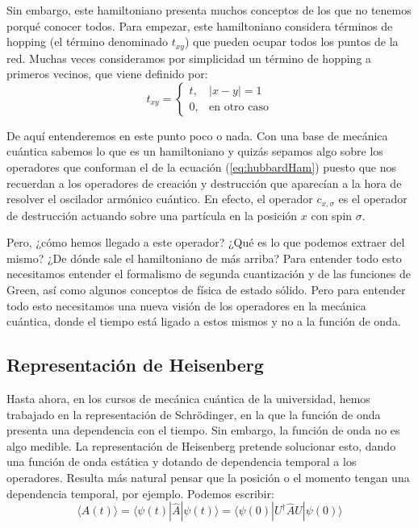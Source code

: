 \documentclass[12pt,twoside]{article}
\begin{document}
Sin embargo, este hamiltoniano presenta muchos conceptos de los que no tenemos porqué conocer todos. Para empezar, este hamiltoniano considera términos de hopping (el término denominado $t_{xy}$) que pueden ocupar todos los puntos de la red. Muchas veces consideramos por simplicidad un término de hopping a primeros vecinos, que viene definido por:
\begin{equation}
  t_{xy} = \left\{\begin{array}{cc}
    t, & |x - y| = 1 \\
    0, & \text{en otro caso}
  \end{array}\right.
  \label{eq:hoppinFN}
\end{equation}

De aquí entenderemos en este punto poco o nada. Con una base de mecánica cuántica sabemos lo que es un hamiltoniano y quizás sepamos algo sobre los operadores que conforman el de la ecuación (\ref{eq:hubbardHam}) puesto que nos recuerdan a los operadores de creación y destrucción que aparecían a la hora de resolver el oscilador armónico cuántico. En efecto, el operador $c_{x,\sigma}$ es el operador de destrucción actuando sobre una partícula en la posición $x$ con spin $\sigma$.

Pero, ¿cómo hemos llegado a este operador? ¿Qué es lo que podemos extraer del mismo? ¿De dónde sale el hamiltoniano de más arriba? Para entender todo esto necesitamos entender el formalismo de segunda cuantización y de las funciones de Green, así como algunos conceptos de física de estado sólido. Pero para entender todo esto necesitamos una nueva visión de los operadores en la mecánica cuántica, donde el tiempo está ligado a estos mismos y no a la función de onda.
\subsection{Representación de Heisenberg}

Hasta ahora, en los cursos de mecánica cuántica de la universidad, hemos trabajado en la representación de Schrödinger, en la que la función de onda presenta una dependencia con el tiempo. Sin embargo, la función de onda no es algo medible. La representación de Heisenberg pretende solucionar esto, dando una función de onda estática y dotando de dependencia temporal a los operadores. Resulta más natural pensar que la posición o el momento tengan una dependencia temporal, por ejemplo. Podemos escribir: \cite{2020Schrodinger}
$$
\langle \hat{A}(t) \rangle = \langle \psi(t)|\hat{A}|\psi(t)\rangle = \langle\psi(0)|U^{\dagger}\hat{A}U|\psi(0)\rangle 
$$
\end{document}
